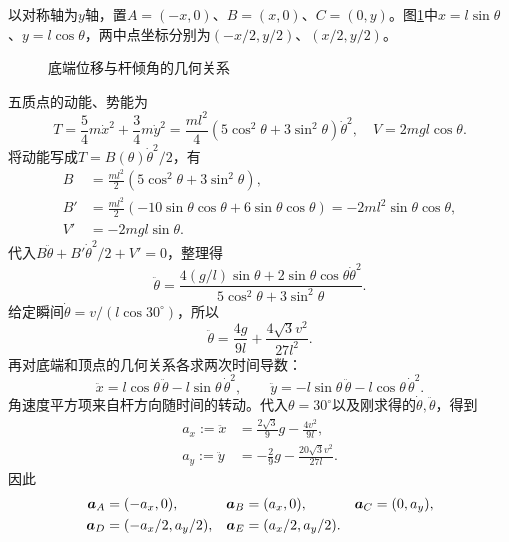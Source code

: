 \begin{solution}
以对称轴为$y$轴，置$A=(-x,0)$、$B=(x,0)$、$C=(0,y)$。图\ref{fig:hw1-3-s}中$x=l\sin\theta$、$y=l\cos\theta$，两中点坐标分别为$(-x/2,y/2)$、$(x/2,y/2)$。

\begin{figure}[H]\centering
{}
\caption{底端位移与杆倾角的几何关系}\label{fig:hw1-3-s}
\end{figure}

五质点的动能、势能为
\[
 T=\frac54m\dot x^2+\frac34m\dot y^2
 =\frac{ml^2}{4}(5\cos^2\theta+3\sin^2\theta)\dot\theta^2,
 \quad V=2mgl\cos\theta.
\]
将动能写成$T=B(\theta)\dot\theta^2/2$，有
\[
\begin{aligned}
B&=\frac{ml^2}{2}(5\cos^2\theta+3\sin^2\theta),\\
B'&=\frac{ml^2}{2}(-10\sin\theta\cos\theta+6\sin\theta\cos\theta)
=-2ml^2\sin\theta\cos\theta,\\
V'&=-2mgl\sin\theta.
\end{aligned}
\]
代入$B\ddot\theta+B'\dot\theta^2/2+V'=0$，整理得
\[
 \ddot\theta=\frac{4(g/l)\sin\theta+
 2\sin\theta\cos\theta\dot\theta^2}
 {5\cos^2\theta+3\sin^2\theta}.
\]
给定瞬间$\dot\theta=v/(l\cos30^\circ)$，所以
\[
 \ddot\theta=\frac{4g}{9l}+\frac{4\sqrt3v^2}{27l^2}.
\]
再对底端和顶点的几何关系各求两次时间导数：
\[
\ddot x=l\cos\theta\,\ddot\theta-l\sin\theta\,\dot\theta^2,
\qquad
\ddot y=-l\sin\theta\,\ddot\theta-l\cos\theta\,\dot\theta^2.
\]
角速度平方项来自杆方向随时间的转动。代入$\theta=30^\circ$以及刚求得的$\dot\theta,\ddot\theta$，得到
\begin{align*}
 a_x:=\ddot x&=\frac{2\sqrt3}{9}g-\frac{4v^2}{9l},\\
 a_y:=\ddot y&=-\frac29g-\frac{20\sqrt3v^2}{27l}.
\end{align*}
因此
\begin{align*}
 \bm{a}_A&=(-a_x,0),&\bm{a}_B&=(a_x,0),&\bm{a}_C&=(0,a_y),\\
 \bm{a}_D&=(-a_x/2,a_y/2),&\bm{a}_E&=(a_x/2,a_y/2).
\end{align*}


\end{solution}
